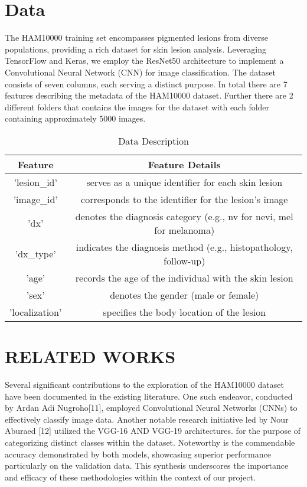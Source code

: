\documentclass[conference]{IEEEtran}
\begin{document}
\section{Data}

The HAM10000 training set encompasses pigmented lesions from diverse populations, providing a rich dataset for skin lesion analysis. Leveraging TensorFlow and Keras, we employ the ResNet50 architecture to implement a Convolutional Neural Network (CNN) for image classification. The dataset consists of seven columns, each serving a distinct purpose. In total there are 7 features describing the metadata of the HAM10000 dataset. Further there are 2 different folders that contains the images for the dataset with each folder containing approximately 5000 images.

\begin{table}[htbp]
  \centering
  \begin{tabular}{|c|c|}
    \hline
    Feature & Feature Details \\
    \hline
    'lesion\_id' & serves as a unique identifier for each skin lesion \\
    \hline
    'image\_id' & corresponds to the identifier for the lesion's image \\
    \hline
    'dx' & denotes the diagnosis category (e.g., nv for nevi, mel for melanoma) \\
    \hline
    'dx\_type' & indicates the diagnosis method (e.g., histopathology, follow-up) \\
     \hline
   'age' & records the age of the individual with the skin lesion \\
    \hline
   'sex' & denotes the gender (male or female) \\
   \hline
   'localization' & specifies the body location of the lesion \\
    \hline
  \end{tabular}
  \caption{Data Description}
  \label{tab:mytable}
\end{table}

\section{RELATED WORKS}

Several significant contributions to the exploration of the HAM10000 dataset have been documented in the existing literature. One such endeavor, conducted by Ardan Adi Nugroho[11], employed Convolutional Neural Networks (CNNs) to effectively classify image data. Another notable research initiative led by Nour Aburaed [12] utilized the VGG-16 AND VGG-19 architectures. for the purpose of categorizing distinct classes within the dataset. Noteworthy is the commendable accuracy demonstrated by both models, showcasing superior performance particularly on the validation data. This synthesis underscores the importance and efficacy of these methodologies within the context of our project.
\end{document}
